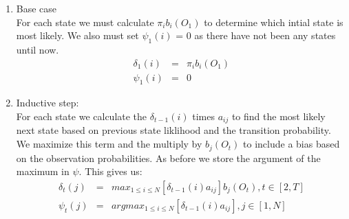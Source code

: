     \begin{enumerate}
        \item Base case \\
        For each state we must calculate $\pi_i b_i(O_1)$ to determine which intial state is most likely. We also must set $\psi_1(i)$ = 0 as there have not been any states until now. 
        \begin{eqnarray}
            \delta_1(i) & = & \pi_i b_i(O_1) \\
            \psi_1(i)   & = & 0
        \end{eqnarray}

        \item Inductive step: \\
        For each state we calculate the $\delta_{t-1}(i)$ times $a_{ij}$ to find the most likely next state based on previous state liklihood and the transition probability. We maximize this term  and the multiply by  $b_j(O_t)$ to include a bias based on the observation probabilities. As before we store the argument of the maximum in $\psi$. This gives us:
        \begin{eqnarray}
            \delta_t(j) & = & max_{1 \leq i \leq N}[\delta_{t-1}(i) a_{ij}] b_j(O_t),  t \in [2,T] \\
            \psi_t(j)   & = & argmax_{1 \leq i \leq N}[\delta_{t-1}(i) a_{ij}], j \in [1,N]
        \end{eqnarray}
        
        \begin{figure}
            \begin{center}
\end{center}
\end{figure}
\end{enumerate}
